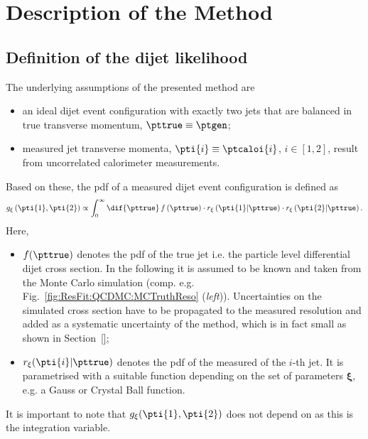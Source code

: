 

\section{Description of the Method}\label{sec:ResFit:Method}

\subsection{Definition of the dijet likelihood}\label{sec:ResFit:Method:Likelihood}


The underlying assumptions of the presented method are
\begin{itemize}
\item an ideal dijet event configuration with exactly two jets that
  are balanced in true transverse momentum, \mbox{$\pttrue\equiv\ptgen$};
\item measured jet transverse momenta,
  \mbox{$\pti{i}\equiv\ptcaloi{i}$}, $i\in[1,2]$, result from uncorrelated
  calorimeter measurements.
\end{itemize}
Based on these, the pdf of a measured dijet event configuration is defined as
\begin{equation}
  \label{eq:ResFit:DijetPdf}
  g_{\mathbf{\xi}}\left(\pti{1},\pti{2}\right) \propto \int^{\infty}_{0}\dif{\pttrue}\,f\left(\pttrue\right)
  \cdot r_{\mathbf{\xi}}\left(\pti{1}|\pttrue\right)
  \cdot r_{\mathbf{\xi}}\left(\pti{2}|\pttrue\right).
\end{equation}
Here,
\begin{itemize}
\item $f(\pttrue)$ denotes the pdf of the true jet \pt
  i.e. the particle level differential dijet cross section.
  In the following it is assumed to be known
  and taken from the Monte Carlo simulation
  (comp. e.g. Fig.~\ref{fig:ResFit:QCDMC:MCTruthReso} (\textit{left})).
  Uncertainties on the simulated cross section have to be propagated to
  the measured resolution and added as a systematic uncertainty of the
  method, which is in fact small as shown in Section~\ref{};
\item $r_{\mathbf{\xi}}(\pti{i}|\pttrue)$ denotes the pdf of the measured \pt
  of the $i$-th jet.
  It is parametrised with a suitable function depending on the set of
  parameters $\mathbf{\xi}$, e.g. a Gauss or Crystal Ball function.
\end{itemize}
It is important to note that
$g_{\mathbf{\xi}}(\pti{1},\pti{2})$ does not depend on \pttrue
as this is the integration variable.

